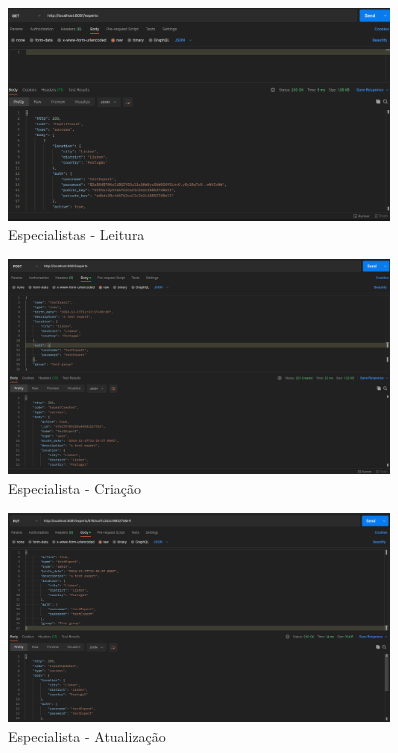 \documentclass[12pt,a4paper,final]{article}
\begin{document}
    \begin{figure}[H]
        \centering
        \includegraphics[width=0.9\textwidth]{get_experts}
        \caption{Especialistas - Leitura}
        \label{fig:get_experts}
    \end{figure}

    \begin{figure}[H]
        \centering
        \includegraphics[width=0.9\textwidth]{cr_expert}
        \caption{Especialista - Criação}
        \label{fig:cr_expert}
    \end{figure}

    \begin{figure}[H]
        \centering
        \includegraphics[width=0.9\textwidth]{update_expert}
        \caption{Especialista - Atualização}
        \label{fig:update_expert}
    \end{figure}
\end{document}
